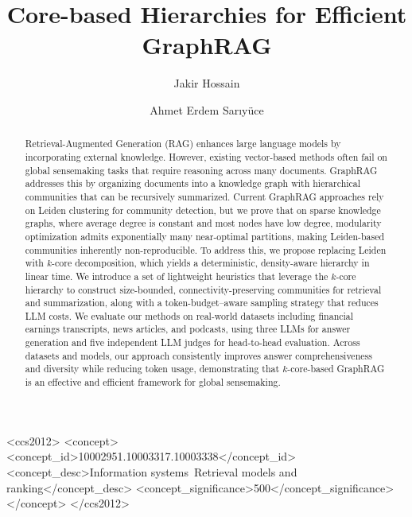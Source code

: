 \documentclass[sigconf]{acmart}
\begin{document}
\title{Core-based Hierarchies for Efficient GraphRAG}

\author{Jakir Hossain}

\author{Ahmet Erdem Sar{\i}y\"{u}ce}



\begin{abstract}
Retrieval-Augmented Generation (RAG) enhances large language models by incorporating external knowledge. However, existing vector-based methods often fail on global sensemaking tasks that require reasoning across many documents. 
GraphRAG addresses this by organizing documents into a knowledge graph with hierarchical communities that can be recursively summarized.
Current GraphRAG approaches rely on Leiden clustering for community detection, but we prove that on sparse knowledge graphs, where average degree is constant and most nodes have low degree, modularity optimization admits exponentially many near-optimal partitions, making Leiden-based communities inherently non-reproducible. To address this, we propose replacing Leiden with $k$-core decomposition, which yields a deterministic, density-aware hierarchy in linear time. 
We introduce a set of lightweight heuristics that leverage the $k$-core hierarchy to construct size-bounded, connectivity-preserving communities for retrieval and summarization, along with a token-budget–aware sampling strategy that reduces LLM costs. 
We evaluate our methods on real-world datasets including financial earnings transcripts, news articles, and podcasts, using three LLMs for answer generation and five independent LLM judges for head-to-head evaluation. Across datasets and models, our approach consistently improves answer comprehensiveness and diversity while reducing token usage, demonstrating that $k$-core-based GraphRAG is an effective and efficient framework for global sensemaking.
\end{abstract}

\begin{CCSXML}
<ccs2012>
   <concept>
       <concept_id>10002951.10003317.10003338</concept_id>
       <concept_desc>Information systems~Retrieval models and ranking</concept_desc>
       <concept_significance>500</concept_significance>
       </concept>
 </ccs2012>
\end{CCSXML}
\end{document}
